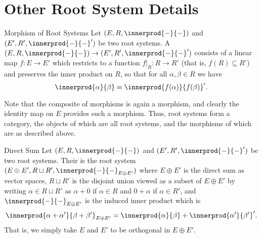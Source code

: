 \documentclass[fleqn]{NotesClass}
\begin{document}
    \section{Other Root System Details}
    \begin{dfn}{Morphism of Root Systems}{}
        Let \((E, R, \innerprod{-}{-})\) and \((E', R', \innerprod{-}{-}')\) be two root systems.
        A  \((E, R, \innerprod{-}{-}) \to (E', R', \innerprod{-}{-}')\) consists of a linear map \(f \colon E \to E'\) which restricts to a function \(f|_R \colon R \to R'\) (that is, \(f(R) \subseteq R'\)) and preserves the inner product on \(R\), so that for all \(\alpha, \beta \in R\) we have
        \begin{equation}
            \innerprod{\alpha}{\beta} = \innerprod{f(\alpha)}{f(\beta)}'.
        \end{equation}
    \end{dfn}
    
    Note that the composite of morphisms is again a morphism, and clearly the identity map on \(E\) provides such a morphism.
    Thus, root systems form a category, the objects of which are all root systems, and the morphisms of which are as described above.
    
    \begin{dfn}{Direct Sum}{}
        Let \((E, R, \innerprod{-}{-})\) and \((E', R', \innerprod{-}{-}')\) be two root systems.
        Their  is the root system \((E \oplus E', R \sqcup R', \innerprod{-}{-}_{E \oplus E'})\) where \(E \oplus E'\) is the direct sum as vector spaces, \(R \sqcup R'\) is the disjoint union viewed as a subset of \(E \oplus E'\) by writing \(\alpha \in R \sqcup R'\) as \(\alpha + 0\) if \(\alpha \in R\) and \(0 + \alpha\) if \(\alpha \in R'\), and \(\innerprod{-}{-}_{E \oplus E'}\) is the induced inner product which is
        \begin{equation}
            \innerprod{\alpha + \alpha'}{\beta + \beta'}_{E \oplus E'} = \innerprod{\alpha}{\beta} + \innerprod{\alpha'}{\beta'}'.
        \end{equation}
        That is, we simply take \(E\) and \(E'\) to be orthogonal in \(E \oplus E'\).
    \end{dfn}
    
\end{document}

